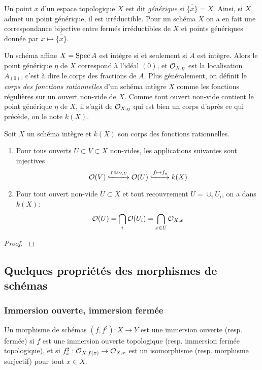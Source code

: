 Un point $x$ d'un espace topologique $X$ est dit \textit{générique} si $\overline{\lbrace x\rbrace}=X$. Ainsi, si $X$ admet un point générique, il est irréductible. Pour un schéma $X$ on a en fait une correspondance bijective entre fermés irréductibles de $X$ et points génériques donnée par $x\mapsto \overline{\lbrace x\rbrace}$. 

Un schéma affine $X=\operatorname{Spec} A$ est intègre si et seulement si $A$ est intègre. Alors le point générique $\eta$ de $X$ correspond à l'idéal $(0)$, et $\mathcal{O}_{X,\eta}$ est la localisation $A_{(0)}$, c'est à dire le corps des fractions de $A$. Plus généralement, on définit le \textit{corps des fonctions rationnelles} d'un schéma intègre $X$ comme les fonctions régulières sur un ouvert non-vide de $X$. Comme tout ouvert non-vide contient le point générique $\eta$ de $X$, il s'agit de $\mathcal{O}_{X,\eta}$ qui est bien un corps d'après ce qui précède, on le note $k(X)$.

\begin{prop}
Soit $X$ un schéma intègre et $k(X)$ son corps des fonctions rationnelles. 
\begin{enumerate}
\item Pour tous ouverts $U\subset V\subset X$ non-vides, les applications suivantes sont injectives
$$\mathcal{O}(V)\xhookrightarrow{res_{V,U}}\mathcal{O}(U)\xhookrightarrow{f\mapsto f_\eta} k(X)$$
\item Pour tout ouvert non-vide $U\subset X$ et tout recouvrement $U=\cup_i U_i$, on a dans $k(X)$:
$$\mathcal{O}(U)=\bigcap_i \mathcal{O}(U_i)=\bigcap_{x\in U}\mathcal{O}_{X,x}$$
\end{enumerate}
\end{prop}
\begin{proof}
\cite[3.29]{Gortz}
\end{proof}

\subsection{Quelques propriétés des morphismes de schémas}

\subsubsection{Immersion ouverte, immersion fermée}

\begin{defn}
Un morphisme de schémas $(f,f^\sharp):X\rightarrow Y$ est une immersion ouverte (resp. fermée) si $f$ est une immersion ouverte topologique (resp. immersion fermée topologique), et si $f^\sharp_x:\mathcal{O}_{X,f(x)}\rightarrow \mathcal{O}_{X,x}$ est un isomorphisme (resp. morphisme surjectif) pour tout $x\in X$.
\end{defn}

